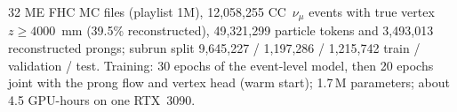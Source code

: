 32 ME FHC MC files (playlist 1M), 12{,}058{,}255 CC~$\nu_\mu$ events with true vertex $z \ge 4000$~mm (39.5\% reconstructed), 49{,}321{,}299 particle tokens and 3{,}493{,}013 reconstructed prongs; subrun split 9{,}645{,}227 / 1{,}197{,}286 / 1{,}215{,}742 train / validation / test. Training: 30 epochs of the event-level model, then 20 epochs joint with the prong flow and vertex head (warm start); 1.7\,M parameters; about 4.5 GPU-hours on one RTX~3090.
